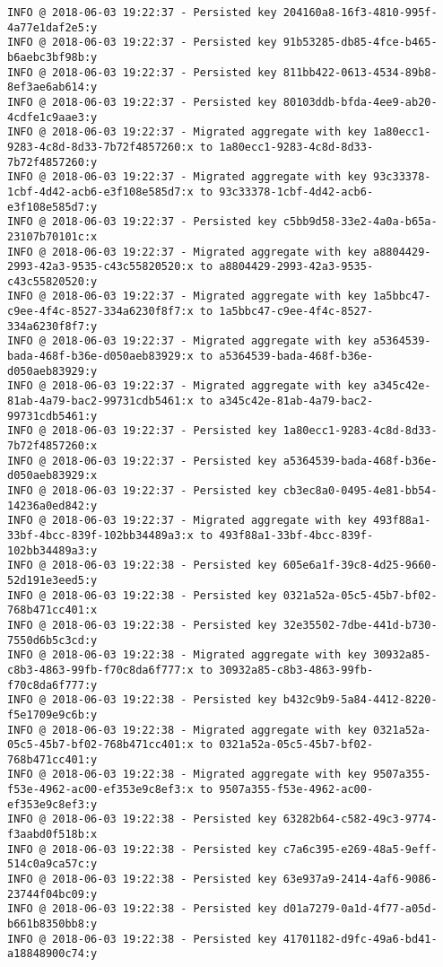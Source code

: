 \begin{lstlisting}[basicstyle=\footnotesize, label={testlog}, caption={De første 50 linjene i den applikasjonsloggen til tjeneren ''vbb-master2018-crabbe''' (se tabell \ref{droplets}) fra test 2.}]
INFO @ 2018-06-03 19:22:37 - Persisted key 204160a8-16f3-4810-995f-4a77e1daf2e5:y
INFO @ 2018-06-03 19:22:37 - Persisted key 91b53285-db85-4fce-b465-b6aebc3bf98b:y
INFO @ 2018-06-03 19:22:37 - Persisted key 811bb422-0613-4534-89b8-8ef3ae6ab614:y
INFO @ 2018-06-03 19:22:37 - Persisted key 80103ddb-bfda-4ee9-ab20-4cdfe1c9aae3:y
INFO @ 2018-06-03 19:22:37 - Migrated aggregate with key 1a80ecc1-9283-4c8d-8d33-7b72f4857260:x to 1a80ecc1-9283-4c8d-8d33-7b72f4857260:y
INFO @ 2018-06-03 19:22:37 - Migrated aggregate with key 93c33378-1cbf-4d42-acb6-e3f108e585d7:x to 93c33378-1cbf-4d42-acb6-e3f108e585d7:y
INFO @ 2018-06-03 19:22:37 - Persisted key c5bb9d58-33e2-4a0a-b65a-23107b70101c:x
INFO @ 2018-06-03 19:22:37 - Migrated aggregate with key a8804429-2993-42a3-9535-c43c55820520:x to a8804429-2993-42a3-9535-c43c55820520:y
INFO @ 2018-06-03 19:22:37 - Migrated aggregate with key 1a5bbc47-c9ee-4f4c-8527-334a6230f8f7:x to 1a5bbc47-c9ee-4f4c-8527-334a6230f8f7:y
INFO @ 2018-06-03 19:22:37 - Migrated aggregate with key a5364539-bada-468f-b36e-d050aeb83929:x to a5364539-bada-468f-b36e-d050aeb83929:y
INFO @ 2018-06-03 19:22:37 - Migrated aggregate with key a345c42e-81ab-4a79-bac2-99731cdb5461:x to a345c42e-81ab-4a79-bac2-99731cdb5461:y
INFO @ 2018-06-03 19:22:37 - Persisted key 1a80ecc1-9283-4c8d-8d33-7b72f4857260:x
INFO @ 2018-06-03 19:22:37 - Persisted key a5364539-bada-468f-b36e-d050aeb83929:x
INFO @ 2018-06-03 19:22:37 - Persisted key cb3ec8a0-0495-4e81-bb54-14236a0ed842:y
INFO @ 2018-06-03 19:22:37 - Migrated aggregate with key 493f88a1-33bf-4bcc-839f-102bb34489a3:x to 493f88a1-33bf-4bcc-839f-102bb34489a3:y
INFO @ 2018-06-03 19:22:38 - Persisted key 605e6a1f-39c8-4d25-9660-52d191e3eed5:y
INFO @ 2018-06-03 19:22:38 - Persisted key 0321a52a-05c5-45b7-bf02-768b471cc401:x
INFO @ 2018-06-03 19:22:38 - Persisted key 32e35502-7dbe-441d-b730-7550d6b5c3cd:y
INFO @ 2018-06-03 19:22:38 - Migrated aggregate with key 30932a85-c8b3-4863-99fb-f70c8da6f777:x to 30932a85-c8b3-4863-99fb-f70c8da6f777:y
INFO @ 2018-06-03 19:22:38 - Persisted key b432c9b9-5a84-4412-8220-f5e1709e9c6b:y
INFO @ 2018-06-03 19:22:38 - Migrated aggregate with key 0321a52a-05c5-45b7-bf02-768b471cc401:x to 0321a52a-05c5-45b7-bf02-768b471cc401:y
INFO @ 2018-06-03 19:22:38 - Migrated aggregate with key 9507a355-f53e-4962-ac00-ef353e9c8ef3:x to 9507a355-f53e-4962-ac00-ef353e9c8ef3:y
INFO @ 2018-06-03 19:22:38 - Persisted key 63282b64-c582-49c3-9774-f3aabd0f518b:x
INFO @ 2018-06-03 19:22:38 - Persisted key c7a6c395-e269-48a5-9eff-514c0a9ca57c:y
INFO @ 2018-06-03 19:22:38 - Persisted key 63e937a9-2414-4af6-9086-23744f04bc09:y
INFO @ 2018-06-03 19:22:38 - Persisted key d01a7279-0a1d-4f77-a05d-b661b8350bb8:y
INFO @ 2018-06-03 19:22:38 - Persisted key 41701182-d9fc-49a6-bd41-a18848900c74:y
\end{lstlisting}

